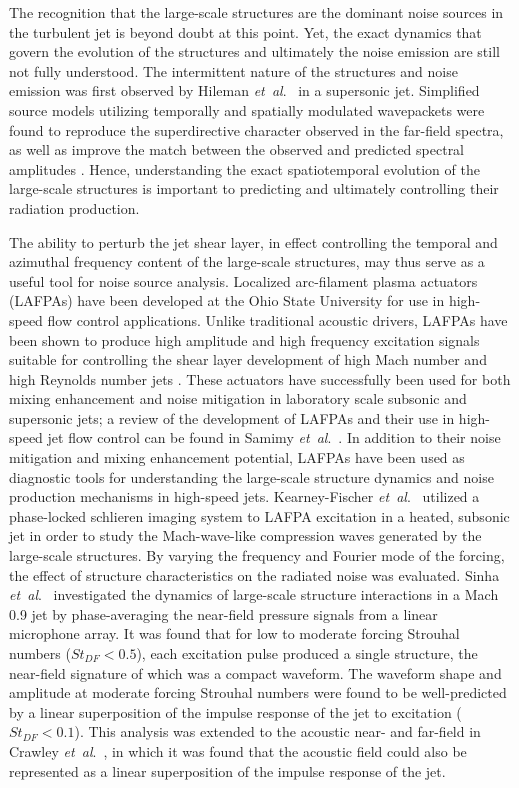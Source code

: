 \documentclass[english]{aiaa-tc}
\newcommand*{\etal}{\textit{et~al}.\ }
\begin{document}
The recognition that the large-scale structures are the dominant noise sources in the turbulent jet is beyond doubt at this point.
Yet, the exact dynamics that govern the evolution of the structures and ultimately the noise emission are still not fully understood.
The intermittent nature of the structures and noise emission was first observed by Hileman \etal \cite{hj2005-1} in a supersonic jet.
Simplified source models utilizing temporally and spatially modulated wavepackets were found to reproduce the superdirective character observed in the far-field spectra, as well as improve the match between the observed and predicted spectral amplitudes \cite{Sandham2006,Cavalieri2010,Crighton1990}.
Hence, understanding the exact spatiotemporal evolution of the large-scale structures is important to predicting and ultimately controlling their radiation production.

The ability to perturb the jet shear layer, in effect controlling the temporal and azimuthal frequency content of the large-scale structures, may thus serve as a useful tool for noise source analysis.
Localized arc-filament plasma actuators (LAFPAs) have been developed at the Ohio State University for use in high-speed flow control applications.
Unlike traditional acoustic drivers, LAFPAs have been shown to produce high amplitude and high frequency excitation signals suitable for controlling the shear layer development of high Mach number and high Reynolds number jets \cite{sm2004-1,uyg2007-2,sm2007-2,sm2007-3}.
These actuators have successfully been used for both mixing enhancement and noise mitigation in laboratory scale subsonic and supersonic jets; a review of the development of LAFPAs and their use in high-speed jet flow control can be found in Samimy \etal \cite{Samimy2012}.
In addition to their noise mitigation and mixing enhancement potential, LAFPAs have been used as diagnostic tools for understanding the large-scale structure dynamics and noise production mechanisms in high-speed jets.
Kearney-Fischer \etal \cite{Kearney-Fischer2011a} utilized a phase-locked schlieren imaging system to LAFPA excitation in a heated, subsonic jet in order to study the Mach-wave-like compression waves generated by the large-scale structures.
By varying the frequency and Fourier mode of the forcing, the effect of structure characteristics on the radiated noise was evaluated.
Sinha \etal \cite{sinha2013} investigated the dynamics of large-scale structure interactions in a Mach 0.9 jet by phase-averaging the near-field pressure signals from a linear microphone array.
It was found that for low to moderate forcing Strouhal numbers ($St_{DF}  <  0.5$), each excitation pulse produced a single structure, the near-field signature of which was a compact waveform.
The waveform shape and amplitude at moderate forcing Strouhal numbers were found to be well-predicted by a linear superposition of the impulse response of the jet to excitation ($St_{DF}  <  0.1$).
This analysis was extended to the acoustic near- and far-field in Crawley \etal \cite{Crawley2015}, in which it was found that the acoustic field could also be represented as a linear superposition of the impulse response of the jet.
\end{document}
